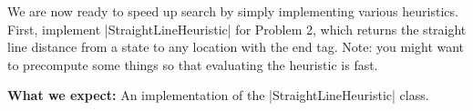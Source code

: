 \item {}

We are now ready to speed up search by simply implementing various heuristics. First, implement |StraightLineHeuristic| for Problem 2, which returns the straight line distance from a state to any location with the end tag. Note: you might want to precompute some things so that evaluating the heuristic is fast.

\textbf{What we expect: } An implementation of the |StraightLineHeuristic| class.

